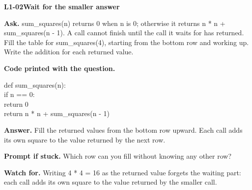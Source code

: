 \documentclass[11pt,a4paper]{article}
\begin{document}
\noindent\begin{minipage}{\textwidth}
{\color{teal}\textbf{L1-02}}\quad \textbf{Wait for the smaller answer}\par\smallskip
\textbf{Ask.} sum\_squares(n) returns 0 when n is 0; otherwise it returns n * n + sum\_squares(n - 1). A call cannot finish until the call it waits for has returned. Fill the table for sum\_squares(4), starting from the bottom row and working up. Write the addition for each returned value.\par\smallskip
{\small\textbf{Code printed with the question.}}\par\smallskip\noindent\colorbox{codepaper}{\parbox{\dimexpr\linewidth-2\fboxsep\relax}{\small\ttfamily\raggedright def sum\_squares(n):\\\hspace*{2.4em}if n == 0:\\\hspace*{4.8em}return 0\\\hspace*{2.4em}return n * n + sum\_squares(n - 1)}}\par
\smallskip\textbf{Answer.} Fill the returned values from the bottom row upward. Each call adds its own square to the value returned by the next row.\par\smallskip
\textbf{Prompt if stuck.} Which row can you fill without knowing any other row?\par\smallskip
\textbf{Watch for.} Writing 4 * 4 = 16 as the returned value forgets the waiting part: each call adds its own square to the value returned by the smaller call.
\end{minipage}\par{}\medskip
\end{document}
